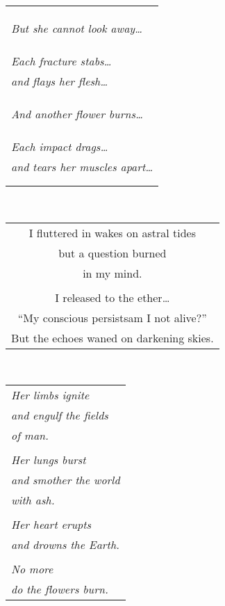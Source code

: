 \documentclass{article}
\begin{document}
\begin{center}
\begin{tabular}{l}
\\
\\
\\
\\
\textit{But she cannot look away\ldots} \\
\\
\\
\\
\textit{Each fracture stabs\ldots} \\
\textit{and flays her flesh\ldots} \\
\\
\\
\\
\textit{And another flower burns\ldots} \\
\\
\\
\\
\textit{Each impact drags\ldots} \\
\textit{and tears her muscles apart\ldots} \\
\\
\\
\end{tabular} \\
\begin{tabular}{c}
\\
I fluttered in wakes on astral tides \\
but a question burned \\
in my mind. \\
\\
I released to the ether\ldots{} \\
``My conscious persists\hspace{3ex}am I not alive?'' \\
But the echoes waned on darkening skies. \\
\end{tabular} \\
\begin{tabular}{l}
\\
\textit{Her limbs ignite}\\
\textit{and engulf the fields}\\
\textit{of man.} \\
\\
\textit{Her lungs burst} \\
\textit{and smother the world} \\
\textit{with ash.} \\
\\
\textit{Her heart erupts} \\
\textit{and drowns the Earth.} \\
\\
\textit{No more} \\
\textit{do the flowers burn.} \\
\end{tabular}
\end{center}
\end{document}
